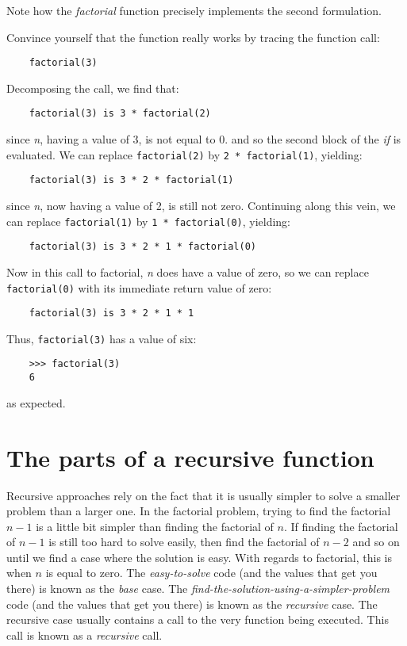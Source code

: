 Note how  the {\it factorial} function
precisely implements the second formulation.

Convince yourself that the function really works by tracing the function call:

\begin{verbatim}
    factorial(3)
\end{verbatim}

Decomposing the call, we find that:

\begin{verbatim}
    factorial(3) is 3 * factorial(2)
\end{verbatim}

since {\it n}, having a value of 3, is not equal to 0.
and so the second block of the {\it if} is evaluated.
We can replace \verb!factorial(2)!
by \verb!2 * factorial(1)!, yielding:

\begin{verbatim}
    factorial(3) is 3 * 2 * factorial(1)
\end{verbatim}

since {\it n}, now having a value of 2, is still not zero.
Continuing along this vein, we can replace
\verb!factorial(1)! by \verb!1 * factorial(0)!, yielding:

\begin{verbatim}
    factorial(3) is 3 * 2 * 1 * factorial(0)
\end{verbatim}

Now in this call to factorial,
{\it n} does have a value of zero, so we can replace
\verb!factorial(0)! with its immediate return value of zero:

\begin{verbatim}
    factorial(3) is 3 * 2 * 1 * 1
\end{verbatim}

Thus, \verb!factorial(3)! has a value of six:

\begin{verbatim}
    >>> factorial(3)
    6
\end{verbatim}

as expected.

\section{The parts of a recursive function}

Recursive approaches rely on the fact that it is
usually simpler to solve a smaller problem than a
larger one. In the factorial problem, trying to
find the factorial $n - 1$ is a little bit simpler
than finding the factorial of $n$. If finding the
factorial of $n - 1$ is still too hard to solve easily,
then find the factorial of $n - 2$ and so on until
we find a case where the solution is easy.
With regards to factorial, this is when $n$ is equal to
zero. The {\it easy-to-solve} code (and the values that get
you there) is known as the {\it base} case. The
{\it find-the-solution-using-a-simpler-problem} code (and the values
that get you there) is known as the {\it recursive} case.
The recursive case usually contains a call to the very
function being executed. This call is known as a
{\it recursive} call.

